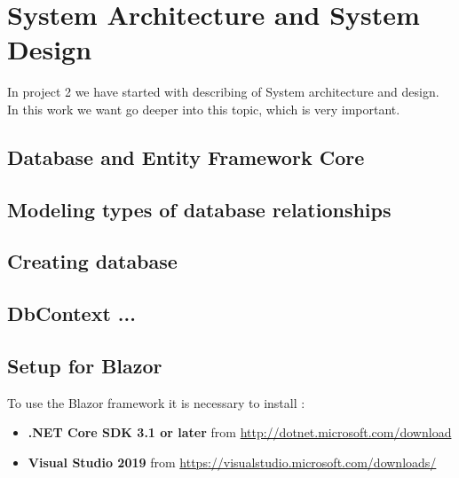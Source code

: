\documentclass{scrartcl}
\begin{document}
\section{System Architecture and System Design}
In project 2 we have started with describing of System architecture and design. In this work we want go deeper into this topic, which is very important.

\subsection{Database and Entity Framework Core}

\subsection{Modeling types of database relationships}

\subsection{Creating database}

\subsection{DbContext ...}









\subsection{Setup for Blazor}
To use the Blazor framework it is necessary to install :\\
\begin{itemize}
\item \textbf{.NET Core SDK 3.1 or later} from \url {http://dotnet.microsoft.com/download}
\item \textbf{Visual Studio 2019} from \url {https://visualstudio.microsoft.com/downloads/}
\end{itemize}

\end{document}
